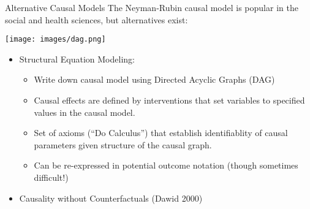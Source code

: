 \documentclass{beamer}
\numberwithin{equation}{section}
\begin{document}
\begin{frame}{Alternative Causal Models}
\small
The Neyman-Rubin causal model is popular in the social and health sciences, but
alternatives exist:

\texttt{[image: images/dag.png]}

\begin{itemize}
\itemsep1pt\parskip0pt
\item
  Structural Equation Modeling:

  \begin{itemize}
  \itemsep1pt\parskip0pt
  \item
    Write down causal model using Directed Acyclic Graphs (DAG)
  \item
    Causal effects are defined by interventions that set variables to
    specified values in the causal model.
  \item
    Set of axioms (``Do Calculus'') that establish identifiablity of
    causal parameters given structure of the causal graph.\\
  \item
    Can be re-expressed in potential outcome notation (though sometimes
    difficult!)
  \end{itemize}
\item
  Causality without Counterfactuals (Dawid 2000)
\end{itemize}

\end{frame}
\end{document}
